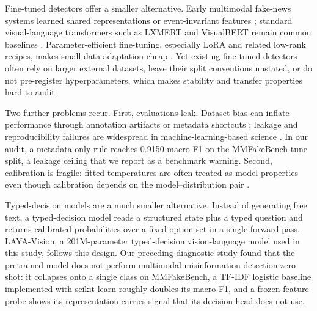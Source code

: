 \documentclass{article} %
\begin{document}
Fine-tuned detectors offer a smaller alternative. Early multimodal fake-news systems learned shared representations or event-invariant features \citep{Khattar2019MvaeMultimodal, Wang2018EannEvent, Singhal2019SpotfakeMultimodal}; standard visual-language transformers such as LXMERT and VisualBERT remain common baselines \citep{Tan2019LxmertLearning, Li2019VisualbertSimple}. Parameter-efficient fine-tuning, especially LoRA and related low-rank recipes, makes small-data adaptation cheap \citep{Hu2021LoraLowrank, Kalajdzievski2023RankStabilization, Shuttleworth2024LoraVs}. Yet existing fine-tuned detectors often rely on larger external datasets, leave their split conventions unstated, or do not pre-register hyperparameters, which makes stability and transfer properties hard to audit.

Two further problems recur. First, evaluations leak. Dataset bias can inflate performance through annotation artifacts or metadata shortcuts \citep{Gururangan2018AnnotationArtifacts, Gebru2018DatasheetsDatasets}; leakage and reproducibility failures are widespread in machine-learning-based science \citep{Kapoor2023LeakageReproducibility, Pineau2020ImprovingReproducibility, Kapoor2024ReformsConsensusbased}. In our audit, a metadata-only rule reaches 0.9150 macro-F1 on the MMFakeBench tune split, a leakage ceiling that we report as a benchmark warning. Second, calibration is fragile: fitted temperatures are often treated as model properties even though calibration depends on the model--distribution pair \citep{Guo2017CalibrationModern, Naeini2015ObtainingWell, Ovadia2019CanYou, Minderer2021RevisitingCalibration}.

Typed-decision models are a much smaller alternative. Instead of generating free text, a typed-decision model reads a structured state plus a typed question and returns calibrated probabilities over a fixed option set in a single forward pass. LAYA-Vision, a 201M-parameter typed-decision vision-language model used in this study, follows this design. Our preceding diagnostic study found that the pretrained model does not perform multimodal misinformation detection zero-shot: it collapses onto a single class on MMFakeBench, a TF-IDF logistic baseline implemented with scikit-learn \citep{Pedregosa2011ScikitlearnMachine} roughly doubles its macro-F1, and a frozen-feature probe shows its representation carries signal that its decision head does not use.
\end{document}
